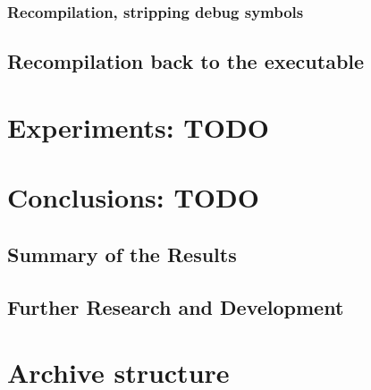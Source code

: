 \documentclass[12pt, twoside]{fithesis2}
\renewcommand{\_}{\leavevmode \kern0.07em\vbox{\hrule width0.4em}}
\begin{document}
\subsection{Recompilation, stripping debug symbols}

\section{Recompilation back to the executable}

\chapter{Experiments: TODO}
\label{chap:experiments}


\chapter{Conclusions: TODO}
\label{chap:conclusions}

\section{Summary of the Results}
\label{sec:conclusions-summary}


\section{Further Research and Development}
\label{sec:conclusions-next}



\appendix

\printbibliography

\chapter{Archive structure}
\label{appendix:archive}
\end{document}
